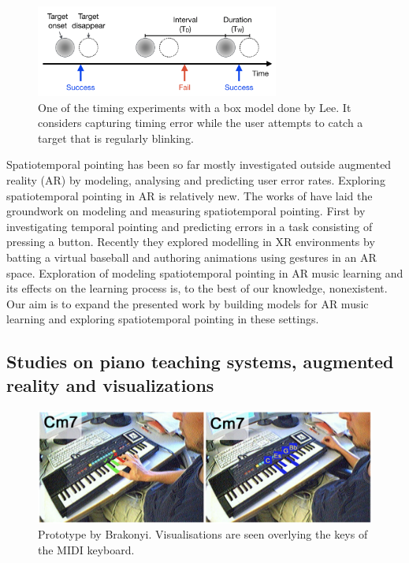 \documentclass[manuscript,screen]{acmart}
\begin{document}
\begin{figure}[t]
\centering
 \includegraphics[width=8cm]{figures/boxmodel.png}
    \caption{One of the timing experiments with a box model done by Lee. It considers capturing timing error while the user attempts to catch a target that is regularly blinking.
    }\label{fig:boxmodel}
\end{figure}

Spatiotemporal pointing has been so far mostly investigated outside augmented reality (AR) by modeling, analysing and predicting user error rates. Exploring spatiotemporal pointing in AR is relatively new. The works of \citet{liao2020button, lee2019geometrically, arora2019magicalhands} have laid the groundwork on modeling and measuring spatiotemporal pointing. First by investigating temporal pointing and predicting errors in a task consisting of pressing a button. Recently they explored modelling in XR environments by batting a virtual baseball and authoring animations using gestures in an AR space. Exploration of modeling spatiotemporal pointing in AR music learning and its effects on the learning process is, to the best of our knowledge, nonexistent. Our aim is to expand the presented work by building models for AR music learning and exploring spatiotemporal pointing in these settings. 

\subsection{Studies on piano teaching systems, augmented reality and visualizations}

\begin{figure}[h]
\centering
 \includegraphics[width=12cm]{figures/barakonyi.png}
    \caption{Prototype by Brakonyi. Visualisations are seen overlying the keys of the MIDI keyboard.
    }\label{fig:barakonyi}
\end{figure}
\end{document}
